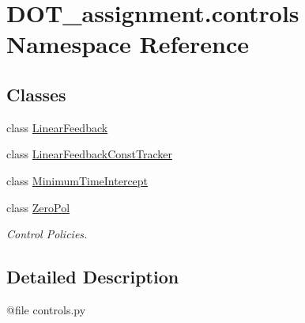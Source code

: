 \hypertarget{namespace_d_o_t__assignment_1_1controls}{}\section{D\+O\+T\+\_\+assignment.\+controls Namespace Reference}
\label{namespace_d_o_t__assignment_1_1controls}
\subsection*{Classes}
\begin{DoxyCompactItemize}
\item 
class \mbox{\hyperlink{class_d_o_t__assignment_1_1controls_1_1_linear_feedback}{Linear\+Feedback}}
\item 
class \mbox{\hyperlink{class_d_o_t__assignment_1_1controls_1_1_linear_feedback_const_tracker}{Linear\+Feedback\+Const\+Tracker}}
\item 
class \mbox{\hyperlink{class_d_o_t__assignment_1_1controls_1_1_minimum_time_intercept}{Minimum\+Time\+Intercept}}
\item 
class \mbox{\hyperlink{class_d_o_t__assignment_1_1controls_1_1_zero_pol}{Zero\+Pol}}
\begin{DoxyCompactList}\small\item\em Control Policies. \end{DoxyCompactList}\end{DoxyCompactItemize}


\subsection{Detailed Description}
\begin{DoxyVerb}@file controls.py
\end{DoxyVerb}
 